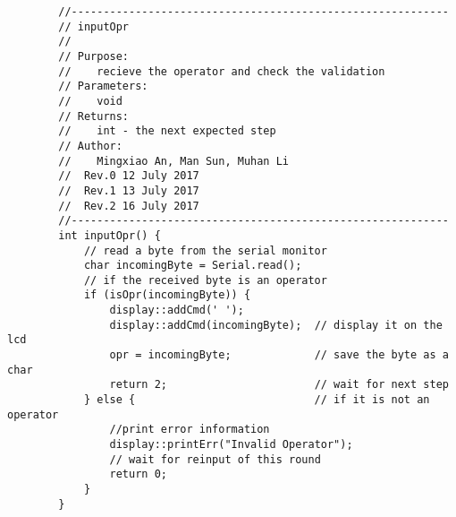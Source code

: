 \begin{verbatim}
        //-----------------------------------------------------------  
        // inputOpr 
        //  
        // Purpose:  
        //    recieve the operator and check the validation
        // Parameters:  
        //    void 
        // Returns:  
        //    int - the next expected step   
        // Author:  
        //    Mingxiao An, Man Sun, Muhan Li
        //  Rev.0 12 July 2017
        //  Rev.1 13 July 2017
        //  Rev.2 16 July 2017
        //-----------------------------------------------------------
        int inputOpr() {
            // read a byte from the serial monitor
            char incomingByte = Serial.read();
            // if the received byte is an operator
            if (isOpr(incomingByte)) {
                display::addCmd(' ');
                display::addCmd(incomingByte);  // display it on the lcd
                opr = incomingByte;             // save the byte as a char
                return 2;                       // wait for next step
            } else {                            // if it is not an operator
                //print error information
                display::printErr("Invalid Operator");
                // wait for reinput of this round
                return 0;
            }
        }


\end{verbatim}
